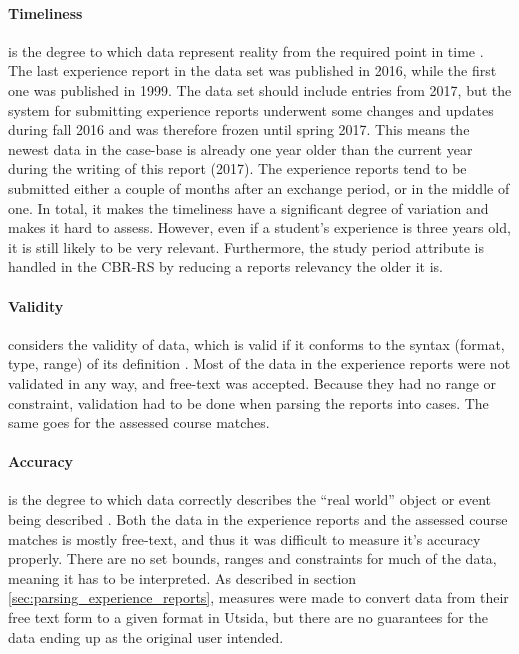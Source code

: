 \paragraph{Timeliness} is the degree to which data represent reality from the required point in time \cite{askham2013six}. The last experience report in the data set was published in 2016, while the first one was published in 1999. The data set should include entries from 2017, but the system for submitting experience reports underwent some changes and updates during fall 2016 and was therefore frozen until spring 2017. This means the newest data in the case-base is already one year older than the current year during the writing of this report (2017). The experience reports tend to be submitted either a couple of months after an exchange period, or in the middle of one. In total, it makes the timeliness have a significant degree of variation and makes it hard to assess. However, even if a student's experience is three years old, it is still likely to be very relevant. Furthermore, the study period attribute is handled in the CBR-RS by reducing a reports relevancy the older it is.

\paragraph{Validity} considers the validity of data, which is valid if it conforms to the syntax (format, type, range) of its definition \cite{askham2013six}. Most of the data in the experience reports were not validated in any way, and free-text was accepted. Because they had no range or constraint, validation had to be done when parsing the reports into cases. The same goes for the assessed course matches.

\paragraph{Accuracy} is the degree to which data correctly describes the \enquote{real world} object or event being described \cite{askham2013six}. Both the data in the experience reports and the assessed course matches is mostly free-text, and thus it was difficult to measure it's accuracy properly. There are no set bounds, ranges and constraints for much of the data, meaning it has to be interpreted. As described in section \ref{sec:parsing_experience_reports}, measures were made to convert data from their free text form to a given format in Utsida, but there are no guarantees for the data ending up as the original user intended.

